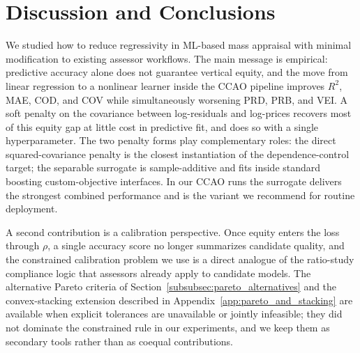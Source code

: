 \documentclass{article}
\theoremstyle{plain}
\theoremstyle{definition}
\newcommand{\1}{\mathbf{1}}
\begin{document}

\section{Discussion and Conclusions}
\label{sec:discussion}

We studied how to reduce regressivity in ML-based mass appraisal with minimal modification to existing assessor workflows. The main message is empirical: predictive accuracy alone does not guarantee vertical equity, and the move from linear regression to a nonlinear learner inside the CCAO pipeline improves $R^2$, MAE, COD, and COV while simultaneously worsening PRD, PRB, and VEI. A soft penalty on the covariance between log-residuals and log-prices recovers most of this equity gap at little cost in predictive fit, and does so with a single hyperparameter. The two penalty forms play complementary roles: the direct squared-covariance penalty is the closest instantiation of the dependence-control target; the separable surrogate is sample-additive and fits inside standard boosting custom-objective interfaces. In our CCAO runs the surrogate delivers the strongest combined performance and is the variant we recommend for routine deployment.

A second contribution is a calibration perspective. Once equity enters the loss through $\rho$, a single accuracy score no longer summarizes candidate quality, and the constrained calibration problem we use is a direct analogue of the ratio-study compliance logic that assessors already apply to candidate models. The alternative Pareto criteria of Section~\ref{subsubsec:pareto_alternatives} and the convex-stacking extension described in Appendix~\ref{app:pareto_and_stacking} are available when explicit tolerances are unavailable or jointly infeasible; they did not dominate the constrained rule in our experiments, and we keep them as secondary tools rather than as coequal contributions.
\end{document}
